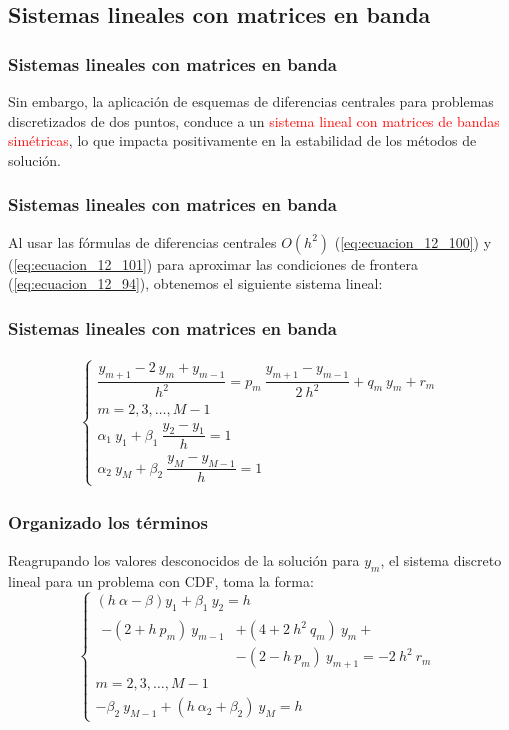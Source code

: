 \subsection{Sistemas lineales con matrices en banda}
\begin{frame}
\frametitle{Sistemas lineales con matrices en banda}
Sin embargo, la aplicación de esquemas de diferencias centrales para problemas discretizados de dos puntos, conduce a un \textcolor{red}{sistema lineal con matrices de bandas simétricas}, lo que impacta positivamente en la estabilidad de los métodos de solución.
\end{frame}
\begin{frame}
\frametitle{Sistemas lineales con matrices en banda}
Al usar las fórmulas de diferencias centrales $O(h^{2})$ (\ref{eq:ecuacion_12_100}) y (\ref{eq:ecuacion_12_101}) para aproximar las condiciones de frontera (\ref{eq:ecuacion_12_94}), obtenemos el siguiente sistema lineal:
\end{frame}
\begin{frame}
\frametitle{Sistemas lineales con matrices en banda}
\fontsize{12}{12}\selectfont
\begin{align*}
\begin{cases}
\dfrac{y_{m + 1} - 2 \: y_{m} + y_{m - 1}}{h^{2}} = p_{m} \: \dfrac{y_{m + 1} - y_{m - 1}}{2 \: h^{2}} + q_{m} \: y_{m} + r_{m} \\
m = 2, 3, \ldots, M - 1 \\
\alpha_{1} \: y_{1} + \beta_{1}  \: \dfrac{y_{2} - y_{1}}{h} = 1 \\
\alpha_{2} \: y_{M} + \beta_{2}  \: \dfrac{y_{M} - y_{M - 1}}{h} = 1
\end{cases}
\end{align*}
\end{frame}
\begin{frame}
\frametitle{Organizado los términos}
Reagrupando los valores desconocidos de la solución para $y_{m}$, el sistema discreto lineal para un problema con CDF, toma la forma:
\pause
\begin{equation}
\begin{cases}
(h \: \alpha - \beta) y_{1} + \beta_{1} \: y_{2} =  h \\
\begin{split}
-(2 + h \: p_{m}) \: y_{m -1} &+ (4 + 2 \: h^{2} \: q_{m}) \: y_{m} + \\
&- (2 - h \: p_{m}) \: y_{m + 1} =  - 2 \: h^{2} \: r_{m}
\end{split} \\
m = 2, 3, \ldots, M - 1 \\
- \beta_{2} \: y_{M - 1} + (h \: \alpha_{2} + \beta_{2}) \: y_{M} = h
\end{cases} 
\label{eq:ecuacion_12_102}
\end{equation}
\end{frame}
